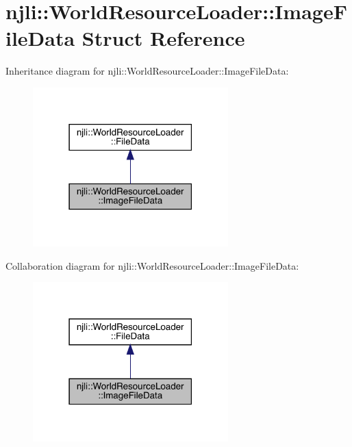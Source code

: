 \hypertarget{structnjli_1_1_world_resource_loader_1_1_image_file_data}{}\section{njli\+:\+:World\+Resource\+Loader\+:\+:Image\+File\+Data Struct Reference}
\label{structnjli_1_1_world_resource_loader_1_1_image_file_data}


Inheritance diagram for njli\+:\+:World\+Resource\+Loader\+:\+:Image\+File\+Data\+:\nopagebreak
\begin{figure}[H]
\begin{center}
\leavevmode
\includegraphics[width=214pt]{structnjli_1_1_world_resource_loader_1_1_image_file_data__inherit__graph}
\end{center}
\end{figure}


Collaboration diagram for njli\+:\+:World\+Resource\+Loader\+:\+:Image\+File\+Data\+:\nopagebreak
\begin{figure}[H]
\begin{center}
\leavevmode
\includegraphics[width=214pt]{structnjli_1_1_world_resource_loader_1_1_image_file_data__coll__graph}
\end{center}
\end{figure}

